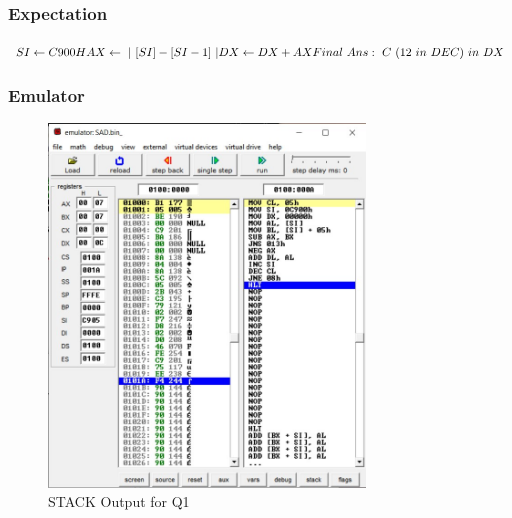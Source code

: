 \documentclass{article}
\begin{document}
\subsubsection{Expectation}
$ SI \leftarrow C900H \\
AX \leftarrow 
\ |\ \lbrack SI  \rbrack - \lbrack SI - 1 \rbrack\  |\\
DX \leftarrow DX + AX  \\
Final\ Ans:\  C\ (12\ in\ DEC)\ in\ DX \\ 
$ 

\break
\subsubsection{Emulator}

\begin{figure}[h]
\begin{center}
\includegraphics[width=0.75\textwidth]{SAD_OUT} 
\caption{STACK Output for Q1}
\end{center}
\end{figure}


\end{document}
